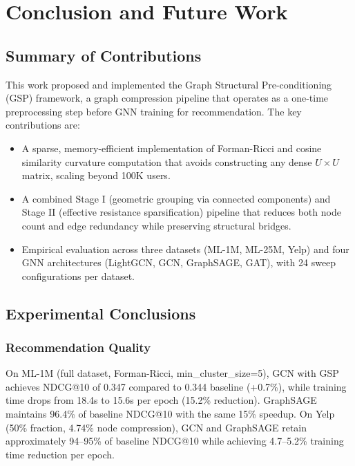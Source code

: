 \chapter{Conclusion and Future Work}
\graphicspath{{Chapter5/}}

\section{Summary of Contributions}

This work proposed and implemented the Graph Structural Pre-conditioning (GSP) framework, a graph compression pipeline that operates as a one-time preprocessing step before GNN training for recommendation. The key contributions are:

\begin{itemize}
    \item A sparse, memory-efficient implementation of Forman-Ricci and cosine similarity curvature computation that avoids constructing any dense $U \times U$ matrix, scaling beyond 100K users.
    \item A combined Stage I (geometric grouping via connected components) and Stage II (effective resistance sparsification) pipeline that reduces both node count and edge redundancy while preserving structural bridges.
    \item Empirical evaluation across three datasets (ML-1M, ML-25M, Yelp) and four GNN architectures (LightGCN, GCN, GraphSAGE, GAT), with 24 sweep configurations per dataset.
\end{itemize}

\section{Experimental Conclusions}

\subsection*{Recommendation Quality}

On ML-1M (full dataset, Forman-Ricci, min\_cluster\_size=5), GCN with GSP achieves NDCG@10 of 0.347 compared to 0.344 baseline (+0.7\%), while training time drops from 18.4s to 15.6s per epoch (15.2\% reduction). GraphSAGE maintains 96.4\% of baseline NDCG@10 with the same 15\% speedup. On Yelp (50\% fraction, 4.74\% node compression), GCN and GraphSAGE retain approximately 94--95\% of baseline NDCG@10 while achieving 4.7--5.2\% training time reduction per epoch.

